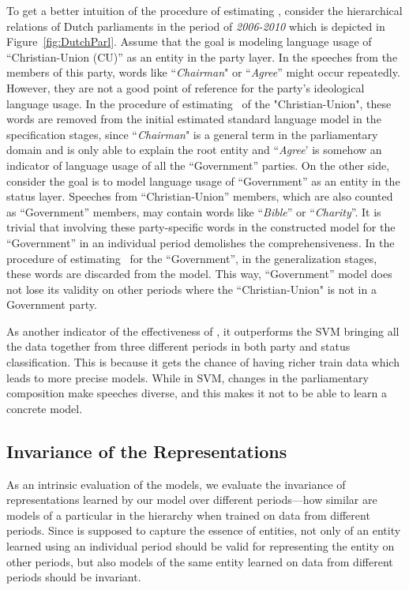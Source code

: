 To get a better intuition of the procedure of estimating \acswlm, consider the hierarchical relations of Dutch parliaments in the period of \emph{2006-2010} which is depicted in Figure~\ref{fig:DutchParl}. 
%
Assume that the goal is modeling language usage of ``Christian-Union (CU)'' as an entity in the party layer. In the speeches from the members of this party, words like ``\emph{Chairman}" or ``\emph{Agree}'' might occur repeatedly. However, they are not a good point of reference for the party's ideological language usage. In the procedure of estimating \acswlm\ of the "Christian-Union", these words are removed from the initial estimated standard language model in the specification stages, since ``\emph{Chairman}" is a general term in the parliamentary domain and is only able to explain the root entity and ``\emph{Agree}' is somehow an indicator of language usage of all the ``Government'' parties.
%
On the other side, consider the goal is to model language usage of ``Government'' as an entity in the status layer. Speeches from ``Christian-Union'' members, which are also counted as ``Government'' members, may contain words like ``\emph{Bible}'' or ``\emph{Charity}''.  It is trivial that involving these party-specific words in the constructed model for the ``Government'' in an individual period demolishes the comprehensiveness. In the procedure of estimating \acswlm\ for the ``Government'', in the generalization stages, these words are discarded from the model. This way, ``Government'' model does not lose its validity on other periods where the ``Christian-Union" is not in a Government party.

As another indicator of the effectiveness of \acswlm, it outperforms the SVM bringing all the data together from three different periods in both party and status classification. This is because it gets the chance of having richer train data which leads to more precise models. While in SVM, changes in the parliamentary composition make speeches diverse, and this makes it not to be able to learn a concrete model. 
\subsection{Invariance of the Representations}

As an intrinsic evaluation of the models, we evaluate the invariance of representations learned by our model over different periods---how similar are models of a particular in the hierarchy when trained on data from different periods. 
%
Since \achswlm is supposed to capture the essence of entities, not only \achswlm of an entity learned using an individual period should be valid for representing the entity on other periods, but also models of the same entity learned on data from different periods should be invariant. 

